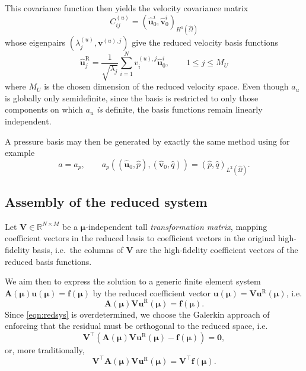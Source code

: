 \documentclass[onecolumn, twoside, a4paper, 11pt]{article}
\begin{document}
This covariance function then yields the velocity covariance matrix
\begin{equation}
  C^{(u)}_{ij} = \left( \hat{\bm u}^i_0, \hat{\bm v}^i_0 \right)_{H^1(\hat{\Omega})}
\end{equation}
whose eigenpairs $(\lambda^{(u)}_j, \bm v^{(u),j})$ give the reduced velocity
basis functions
\begin{equation}
  \hat{\bm u}^\text{R}_j = \frac{1}{\sqrt{\lambda_j}} \sum_{i=1}^N v^{(u),j}_i \hat{\bm u}^i_0,
  \qquad 1 \leq j \leq M_U
\end{equation}
where $M_U$ is the chosen dimension of the reduced velocity space. Even though
$a_u$ is globally only semidefinite, since the basis is restricted to only those
components on which $a_u$ \emph{is} definite, the basis functions remain
linearly independent.

A pressure basis may then be generated by exactly the same method using for
example
\begin{equation}
  a = a_p, \qquad a_p((\hat{\bm u}_0, \hat{p}), (\hat{\bm v}_0, \hat{q})) =
  \left( \hat{p}, \hat{q} \right)_{L^2(\hat{\Omega})}.
\end{equation}

\subsection{Assembly of the reduced system}

Let $\bm V \in \mathbb{R}^{N \times M}$ be a $\bm \mu$-independent
tall \emph{transformation matrix}, mapping coefficient vectors in the
reduced basis to coefficient vectors in the original high-fidelity
basis, i.e.~the columns of $\bm V$ are the high-fidelity coefficient
vectors of the reduced basis functions.

We aim then to express the solution to a generic finite element system
$\bm A(\bm \mu) \bm u(\bm \mu) = \bm f(\bm \mu)$ by the reduced
coefficient vector $\bm u(\bm \mu) = \bm V \bm u^\text{R}(\bm \mu)$, i.e.
\begin{equation}
  \label{eqn:redsys}
  \bm A(\bm \mu) \bm V \bm u^\text{R}(\bm \mu) = \bm f(\bm \mu).
\end{equation}
Since \eqref{eqn:redsys} is overdetermined, we choose the Galerkin
approach of enforcing that the residual must be orthogonal to the
reduced space, i.e.
\begin{equation}
  \label{eqn:redorth}
  \bm V^\intercal \left(
  \bm A(\bm \mu) \bm V \bm u^\text{R}(\bm \mu) - \bm f(\bm \mu)
  \right) = \bm 0,
\end{equation}
or, more traditionally,
\begin{equation}
  \label{eqn:redorth-final}
  \bm V^\intercal \bm A(\bm \mu) \bm V \bm u^\text{R}(\bm \mu) =
  \bm V^\intercal \bm f(\bm \mu).
\end{equation}
\end{document}
